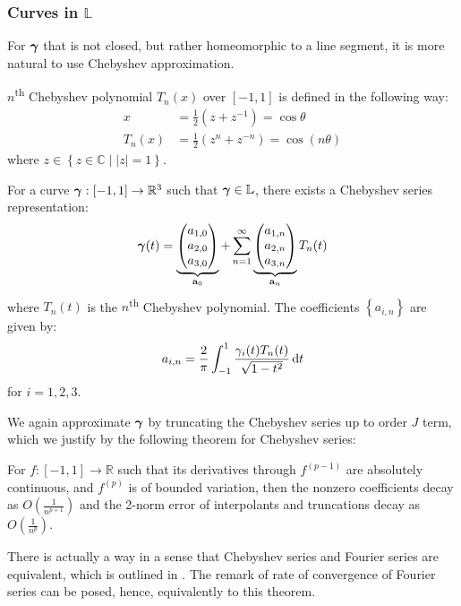 \documentclass[../dissertation.tex]{subfiles}
\begin{document}
\subsubsection{Curves in $\mathbb{L}$}
For $\boldsymbol{\gamma}$ that is not closed, but rather homeomorphic to a line segment,
it is more natural to use Chebyshev approximation\cite{Trefethen_2020}.
\begin{definition}
    $n$\textsuperscript{th} Chebyshev polynomial $T_n(x)$ over $\left[ -1,1 \right]$ is defined in the following way:
    \begin{align}
        x &= \frac{1}{2} \left( z+z^{-1} \right) = \cos{\theta} \\
        T_n(x) &= \frac{1}{2}\left( z^n + z^{-n} \right) = \cos{(n\theta)}
    \end{align}
    where $z \in \left\{ z\in\mathbb{C} \middle| |z| = 1 \right\}$.
\end{definition}
For a curve $\boldsymbol{\gamma}:\left[ -1, 1 \right] \rightarrow \mathbb{R}^3$ such that $\boldsymbol{\gamma} \in \mathbb{L}$,
there exists a Chebyshev series representation:
\begin{equation}
    \boldsymbol{\gamma} (t) =
    \underbrace{
    \begin{pmatrix}
        a_{1,0} \\
        a_{2,0} \\
        a_{3,0}
    \end{pmatrix}
}_{\mathbf{a}_0}
    +
    \sum_{n=1}^{\infty}
    \underbrace{
    \begin{pmatrix}
        a_{1,n} \\
        a_{2,n} \\
        a_{3,n}
    \end{pmatrix}
}_{\mathbf{a}_n}
    T_n (t)
\end{equation}
where $T_n (t)$ is the $n$\textsuperscript{th} Chebyshev polynomial.
The coefficients $\left\{ a_{i,n} \right\}$ are given by:
\begin{equation}
    a_{i,n} = \frac{2}{\pi} \int_{-1}^{1} \frac{\gamma_i(t) T_n(t)}{\sqrt{1-t^2}} \, \text{d} t
\end{equation}
for $i = 1, 2, 3$.

We again approximate $\boldsymbol{\gamma}$ by truncating the Chebyshev series up to order $J$ term,
which we justify by the following theorem for Chebyshev series:
\begin{theorem}
    \label{thrm: Rate of Convergence of Chebyshev Series}
    For $f:\left[ -1,1 \right]\rightarrow \mathbb{R}$ such that its derivatives through $f^{(p-1)}$ are absolutely continuous, and $f^{(p)}$ is of bounded variation, then the nonzero coefficients decay as $O\left( \frac{1}{n^{p+1}} \right)$ and the 2-norm error of interpolants and truncations decay as $O\left( \frac{1}{n^p} \right)$.
\end{theorem}
\begin{remark}
    There is actually a way in a sense that Chebyshev series and Fourier series are equivalent, which is outlined in \cite{Trefethen_2020}.
    The remark of rate of convergence of Fourier series can be posed, hence, equivalently to this theorem.
\end{remark}
\end{document}
